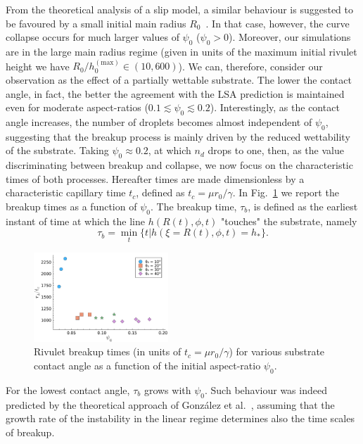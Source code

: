 \documentclass[%
 aip,
 amsmath,amssymb,
 reprint,%
]{revtex4-1}
\begin{document}
From the theoretical analysis of a slip model, a similar behaviour is suggested to be favoured by a small initial main radius $R_0$~\cite{gonzalezStabilityLiquidRing2013}. 
In that case, however, the curve collapse occurs for much larger values of $\psi_0$ ($\psi_0 >0$). 
Moreover, our simulations are in the large main radius regime (given in units of the maximum initial rivulet height we have $R_0/h_0^{(\text{max})} \in (10, 600)$). 
We can, therefore, consider our observation as the effect of a partially wettable substrate. 
The lower the contact angle, in fact, the better the agreement with the LSA prediction is maintained even for moderate aspect-ratios ($0.1 \lesssim \psi_0 \lesssim 0.2$). 
Interestingly, as the contact angle increases, the number of droplets becomes almost independent of $\psi_0$, suggesting that the breakup process is mainly driven by the reduced wettability of the substrate.
Taking $\psi_0 \approx 0.2$, at which $n_d$ drops to one, then, as the value discriminating between breakup and collapse, we now focus on the characteristic times of both processes.
Hereafter times are made dimensionless by a characteristic capillary time $t_c$, defined as $t_c = \mu r_0/\gamma$.
In Fig.~\ref{fig:breakuptimes} we report the breakup times as a function of $\psi_0$.
The breakup time, $\tau_b$, is defined as the earliest instant of time at which the line $h(R(t),\phi,t)$ "touches" the substrate, namely
\begin{equation}\label{eq:breakuptime}
\tau_b = \min_t \{t | h(\xi=R(t),\phi,t) = h_{\ast}\}.
\end{equation}
\begin{figure}
    \centering
    \includegraphics[width = 0.45\textwidth]{Figure_3.pdf}
    \caption{Rivulet breakup times (in units of $t_c = \mu r_0/\gamma$) for various substrate contact angle as a function of the initial aspect-ratio $\psi_0$.}
    \label{fig:breakuptimes}
\end{figure}
For the lowest contact angle, $\tau_b$ grows with $\psi_0$. 
Such behaviour was indeed predicted by the theoretical approach of Gonz\'alez et al.~\cite{gonzalezStabilityLiquidRing2013}, assuming that the growth rate of the instability in the linear regime determines also the time scales of breakup. 
\end{document}
